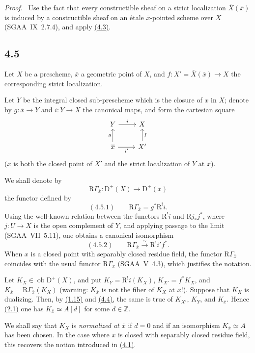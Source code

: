 \documentclass[11pt]{article}
\newenvironment{prooftext}[1][Proof]{\par\noindent\emph{#1.}\ }{\par\medskip}
\newcommand{\R}{\mathrm{R}}
\newcommand{\D}{\mathrm{D}}
\newcommand{\Z}{\mathbb{Z}}
\newcommand{\ob}{\operatorname{ob}}
\newcommand{\ol}[1]{\overline{#1}}
\providecommand{\ob}{\operatorname{ob}}
\providecommand{\R}{\mathrm R}
\providecommand{\Z}{\mathbb Z}
\begin{document}
\begin{prooftext}[Proof]
Use the fact that every constructible sheaf on a strict localization $\ol{X}(\ol{x})$ is induced by a constructible sheaf on an étale $\ol{x}$-pointed scheme over $X$ (SGAA~IX~2.7.4), and apply \hyperref[sga5:I:equation:4.3]{(4.3)}.
\end{prooftext}

\subsection*{4.5}\label{sga5:I:subsection:4.5}
Let $X$ be a prescheme, $\ol{x}$ a geometric point of $X$, and $f:X'=\ol{X}(\ol{x})\to X$ the corresponding strict localization.

Let $Y$ be the integral closed sub-prescheme which is the closure of $x$ in $X$; denote by $g:\ol{x}\to Y$ and $i:Y\to X$ the canonical maps, and form the cartesian square
\[
\begin{tikzcd}
Y \arrow[r,"i"] & X \\
\ol{x} \arrow[u,"g"] \arrow[r,"i'"'] & X' \arrow[u,"f"']
\end{tikzcd}
\]
($\ol{x}$ is both the closed point of $X'$ and the strict localization of $Y$ at $\ol{x}$).

We shall denote by
\[
\R\Gamma_{\ol{x}}:\D^+(X)\longrightarrow \D^+(\ol{x})
\]
the functor defined by
\label{sga5:I:equation:4.5.1}\[
(4.5.1)\qquad \R\Gamma_{\ol{x}}=g^*\R^{!}i.
\]
Using the well-known relation between the functors $\R^{!}i$ and $\R j_*j^*$, where $j:U\to X$ is the open complement of $Y$, and applying passage to the limit (SGAA~VII~5.11), one obtains a canonical isomorphism
\label{sga5:I:equation:4.5.2}\[
(4.5.2)\qquad \R\Gamma_{\ol{x}}\xrightarrow{\sim}\R^{!}i' f^*.
\]
When $x$ is a closed point with separably closed residue field, the functor $\R\Gamma_{\ol{x}}$ coincides with the usual functor $\R\Gamma_x$ (SGAA~V~4.3), which justifies the notation.

Let $K_X\in\ob\D^+(X)$, and put $K_Y=\R^{!}i(K_X)$, $K_{X'}=f^*K_X$, and $K_{\ol{x}}=\R\Gamma_{\ol{x}}(K_X)$ (warning: $K_{\ol{x}}$ is not the fiber of $K_X$ at $\ol{x}$!). Suppose that $K_X$ is dualizing. Then, by \hyperref[sga5:I:corollary:1.15]{(1.15)} and \hyperref[sga5:I:lemma:4.4]{(4.4)}, the same is true of $K_{X'}$, $K_Y$, and $K_{\ol{x}}$. Hence \hyperref[sga5:I:theorem:2.1]{(2.1)} one has $K_{\ol{x}}\simeq A[d]$ for some $d\in\Z$.

We shall say that $K_X$ is \emph{normalized at $\ol{x}$} if $d=0$ and if an isomorphism $K_{\ol{x}}\simeq A$ has been chosen. In the case where $x$ is closed with separably closed residue field, this recovers the notion introduced in \hyperref[sga5:I:equation:4.1]{(4.1)}.
\end{document}

